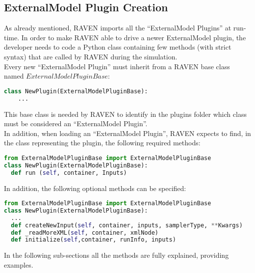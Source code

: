 \subsection{ExternalModel Plugin Creation}
\label{subsec:externalModelPluginCreation}
As already mentioned, RAVEN imports all the ``ExternalModel Plugins'' at run-time.
In order to make RAVEN
able to drive a newer ExternalModel plugin, the developer needs to code a Python class
containing few methods (with strict syntax) that are called by RAVEN during the simulation.
\\ Every new ``ExternalModel Plugin'' must inherit from a RAVEN base class named
$ExternalModelPluginBase$:
\begin{lstlisting}[language=python]
  class NewPlugin(ExternalModelPluginBase):
    ...
\end{lstlisting}
This base class is needed by RAVEN to identify in the plugins folder which class must
be considered an  ``ExternalModel Plugin''.
\\ In addition, when loading an ``ExternalModel Plugin'', RAVEN expects to find, in the class representing the plugin,
 the following required methods:
\begin{lstlisting}[language=python]
from ExternalModelPluginBase import ExternalModelPluginBase
class NewPlugin(ExternalModelPluginBase):
  def run (self, container, Inputs)
\end{lstlisting}
In addition, the following optional methods can be specified:
\begin{lstlisting}[language=python]
from ExternalModelPluginBase import ExternalModelPluginBase
class NewPlugin(ExternalModelPluginBase):
  ...
  def createNewInput(self, container, inputs, samplerType, **Kwargs)
  def _readMoreXML(self, container, xmlNode)
  def initialize(self,container, runInfo, inputs)
\end{lstlisting}
In the following sub-sections all the methods are fully explained, providing examples.
